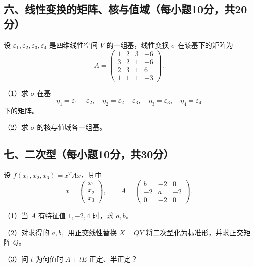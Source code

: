 \documentclass[11pt,fontset=fandol]{ctexart}
\begin{document}
\subsection{六、线性变换的矩阵、核与值域（每小题10分，共20分）}\label{ux516dux7ebfux6027ux53d8ux6362ux7684ux77e9ux9635ux6838ux4e0eux503cux57dfux6bcfux5c0fux989810ux5206ux517120ux5206}

设 \(\varepsilon_1,\varepsilon_2,\varepsilon_3,\varepsilon_4\)
是四维线性空间 \(V\) 的一组基，线性变换 \(\sigma\) 在该基下的矩阵为 \[
A=\begin{pmatrix}1&2&3&-6\\3&2&1&-6\\2&3&1&6\\1&1&1&-3\end{pmatrix}.
\]

（1）求 \(\sigma\) 在基 \[
\eta_1=\varepsilon_1+\varepsilon_2,\quad
\eta_2=\varepsilon_2-\varepsilon_3,\quad
\eta_3=\varepsilon_3,\quad\eta_4=\varepsilon_4
\] 下的矩阵。

（2）求 \(\sigma\) 的核与值域各一组基。

\subsection{七、二次型（每小题10分，共30分）}\label{ux4e03ux4e8cux6b21ux578bux6bcfux5c0fux989810ux5206ux517130ux5206}

设 \(f(x_1,x_2,x_3)=x^TAx\)，其中 \[
x=\begin{pmatrix}x_1\\x_2\\x_3\end{pmatrix},\qquad
A=\begin{pmatrix}b&-2&0\\-2&a&-2\\0&-2&0\end{pmatrix}.
\]

（1）当 \(A\) 有特征值 \(1,-2,4\) 时，求 \(a,b\)。

（2）对求得的 \(a,b\)，用正交线性替换 \(X=QY\)
将二次型化为标准形，并求正交矩阵 \(Q\)。

（3）问 \(t\) 为何值时 \(A+tE\) 正定、半正定？
\end{document}
